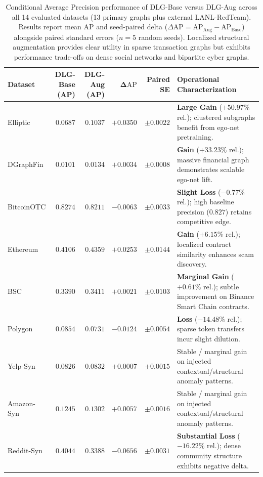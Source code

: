 \begin{table}[htbp]
\centering\footnotesize\setlength{\tabcolsep}{4.5pt}
\caption{Conditional Average Precision performance of DLG-Base versus DLG-Aug across all 14 evaluated datasets (13 primary graphs plus external LANL-RedTeam). Results report mean AP and seed-paired delta ($\Delta\mathrm{AP} = \mathrm{AP}_{\mathrm{Aug}} - \mathrm{AP}_{\mathrm{Base}}$) alongside paired standard errors ($n=5$ random seeds). Localized structural augmentation provides clear utility in sparse transaction graphs but exhibits performance trade-offs on dense social networks and bipartite cyber graphs.}
\label{tab:conditional_delta}
\begin{tabularx}{\textwidth}{lrrrr>{\raggedright\arraybackslash}X}\toprule
\textbf{Dataset} & \textbf{DLG-Base (AP)} & \textbf{DLG-Aug (AP)} & $\mathbf{\Delta\mathrm{AP}}$ & \textbf{Paired SE} & \textbf{Operational Characterization} \\\midrule
Elliptic & $0.0687$ & $0.1037$ & $\mathbf{+0.0350}$ & $\pm 0.0022$ & \textbf{Large Gain} ($+50.97\%$ rel.); clustered subgraphs benefit from ego-net pretraining. \\
DGraphFin & $0.0101$ & $0.0134$ & $+0.0034$ & $\pm 0.0008$ & \textbf{Gain} ($+33.23\%$ rel.); massive financial graph demonstrates scalable ego-net lift. \\
BitcoinOTC & $0.8274$ & $0.8211$ & $-0.0063$ & $\pm 0.0033$ & \textbf{Slight Loss} ($-0.77\%$ rel.); high baseline precision ($0.827$) retains competitive edge. \\
Ethereum & $0.4106$ & $0.4359$ & $\mathbf{+0.0253}$ & $\pm 0.0144$ & \textbf{Gain} ($+6.15\%$ rel.); localized contract similarity enhances scam discovery. \\
BSC & $0.3390$ & $0.3411$ & $+0.0021$ & $\pm 0.0103$ & \textbf{Marginal Gain} ($+0.61\%$ rel.); subtle improvement on Binance Smart Chain contracts. \\
Polygon & $0.0854$ & $0.0731$ & $-0.0124$ & $\pm 0.0054$ & \textbf{Loss} ($-14.48\%$ rel.); sparse token transfers incur slight dilution. \\
Yelp-Syn & $0.0826$ & $0.0832$ & $+0.0007$ & $\pm 0.0015$ & Stable / marginal gain on injected contextual/structural anomaly patterns. \\
Amazon-Syn & $0.1245$ & $0.1302$ & $+0.0057$ & $\pm 0.0016$ & Stable / marginal gain on injected contextual/structural anomaly patterns. \\
Reddit-Syn & $0.4044$ & $0.3388$ & $\mathbf{-0.0656}$ & $\pm 0.0031$ & \textbf{Substantial Loss} ($-16.22\%$ rel.); dense community structure exhibits negative delta. \\

\end{tabularx}
\end{table}
